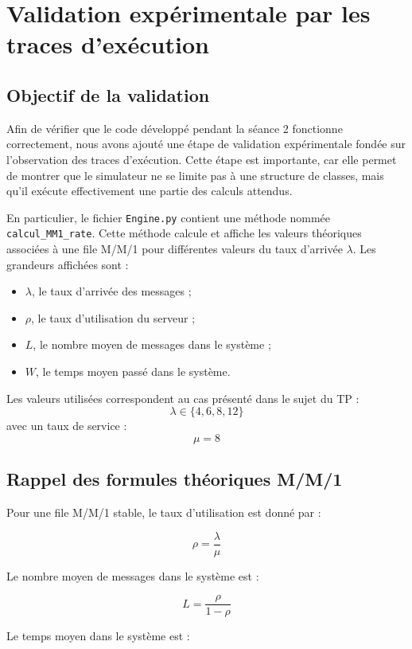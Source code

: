 \documentclass{article}
\begin{document}
\section{Validation expérimentale par les traces d'exécution}

\subsection{Objectif de la validation}

Afin de vérifier que le code développé pendant la séance 2 fonctionne correctement, nous avons ajouté une étape de validation expérimentale fondée sur l'observation des traces d'exécution. Cette étape est importante, car elle permet de montrer que le simulateur ne se limite pas à une structure de classes, mais qu'il exécute effectivement une partie des calculs attendus.

En particulier, le fichier \texttt{Engine.py} contient une méthode nommée \texttt{calcul\_MM1\_rate}. Cette méthode calcule et affiche les valeurs théoriques associées à une file M/M/1 pour différentes valeurs du taux d'arrivée \(\lambda\). Les grandeurs affichées sont :
\begin{itemize}[leftmargin=*]
    \item \(\lambda\), le taux d'arrivée des messages ;
    \item \(\rho\), le taux d'utilisation du serveur ;
    \item \(L\), le nombre moyen de messages dans le système ;
    \item \(W\), le temps moyen passé dans le système.
\end{itemize}

Les valeurs utilisées correspondent au cas présenté dans le sujet du TP :
\[
\lambda \in \{4, 6, 8, 12\}
\]
avec un taux de service :
\[
\mu = 8
\]

\subsection{Rappel des formules théoriques M/M/1}

Pour une file M/M/1 stable, le taux d'utilisation est donné par :

\[
\rho = \frac{\lambda}{\mu}
\]

Le nombre moyen de messages dans le système est :

\[
L = \frac{\rho}{1-\rho}
\]

Le temps moyen dans le système est :
\end{document}
